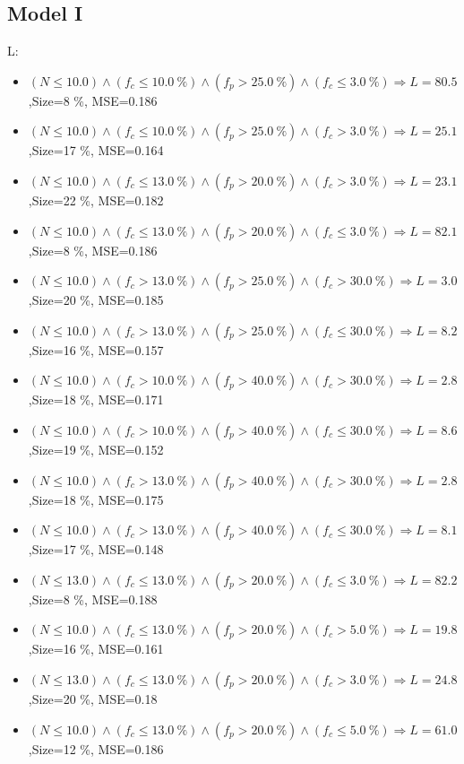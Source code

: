 \documentclass[numbered]{CSL}
\begin{document}
\subsection{Model I}
L:
\begin{itemize}
\item $(N \leq 10.0) \land (f_c \leq 10.0~\%) \land (f_p > 25.0~\%) \land (f_c \leq 3.0~\%) \Rightarrow L = 80.5$,\hfill Size=8 \%, MSE=0.186
\item $(N \leq 10.0) \land (f_c \leq 10.0~\%) \land (f_p > 25.0~\%) \land (f_c > 3.0~\%) \Rightarrow L = 25.1$,\hfill Size=17 \%, MSE=0.164
\item $(N \leq 10.0) \land (f_c \leq 13.0~\%) \land (f_p > 20.0~\%) \land (f_c > 3.0~\%) \Rightarrow L = 23.1$,\hfill Size=22 \%, MSE=0.182
\item $(N \leq 10.0) \land (f_c \leq 13.0~\%) \land (f_p > 20.0~\%) \land (f_c \leq 3.0~\%) \Rightarrow L = 82.1$,\hfill Size=8 \%, MSE=0.186
\item $(N \leq 10.0) \land (f_c > 13.0~\%) \land (f_p > 25.0~\%) \land (f_c > 30.0~\%) \Rightarrow L = 3.0$,\hfill Size=20 \%, MSE=0.185
\item $(N \leq 10.0) \land (f_c > 13.0~\%) \land (f_p > 25.0~\%) \land (f_c \leq 30.0~\%) \Rightarrow L = 8.2$,\hfill Size=16 \%, MSE=0.157
\item $(N \leq 10.0) \land (f_c > 10.0~\%) \land (f_p > 40.0~\%) \land (f_c > 30.0~\%) \Rightarrow L = 2.8$,\hfill Size=18 \%, MSE=0.171
\item $(N \leq 10.0) \land (f_c > 10.0~\%) \land (f_p > 40.0~\%) \land (f_c \leq 30.0~\%) \Rightarrow L = 8.6$,\hfill Size=19 \%, MSE=0.152
\item $(N \leq 10.0) \land (f_c > 13.0~\%) \land (f_p > 40.0~\%) \land (f_c > 30.0~\%) \Rightarrow L = 2.8$,\hfill Size=18 \%, MSE=0.175
\item $(N \leq 10.0) \land (f_c > 13.0~\%) \land (f_p > 40.0~\%) \land (f_c \leq 30.0~\%) \Rightarrow L = 8.1$,\hfill Size=17 \%, MSE=0.148
\item $(N \leq 13.0) \land (f_c \leq 13.0~\%) \land (f_p > 20.0~\%) \land (f_c \leq 3.0~\%) \Rightarrow L = 82.2$,\hfill Size=8 \%, MSE=0.188
\item $(N \leq 10.0) \land (f_c \leq 13.0~\%) \land (f_p > 20.0~\%) \land (f_c > 5.0~\%) \Rightarrow L = 19.8$,\hfill Size=16 \%, MSE=0.161
\item $(N \leq 13.0) \land (f_c \leq 13.0~\%) \land (f_p > 20.0~\%) \land (f_c > 3.0~\%) \Rightarrow L = 24.8$,\hfill Size=20 \%, MSE=0.18
\item $(N \leq 10.0) \land (f_c \leq 13.0~\%) \land (f_p > 20.0~\%) \land (f_c \leq 5.0~\%) \Rightarrow L = 61.0$,\hfill Size=12 \%, MSE=0.186

\end{itemize}
\end{document}
